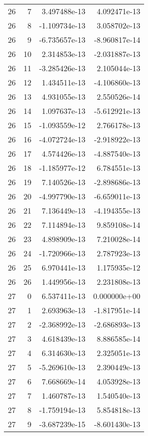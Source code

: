\begin{tabular}{rrrr}
  26 &    7 &  3.497488e-13 &  4.092471e-13 \\
  26 &    8 & -1.109734e-13 &  3.058702e-13 \\
  26 &    9 & -6.735657e-13 & -8.960817e-14 \\
  26 &   10 &  2.314853e-13 & -2.031887e-13 \\
  26 &   11 & -3.285426e-13 &  2.105044e-13 \\
  26 &   12 &  1.434511e-13 & -4.106860e-13 \\
  26 &   13 &  4.931055e-13 &  2.550526e-14 \\
  26 &   14 &  1.097637e-13 & -5.612921e-13 \\
  26 &   15 & -1.093559e-12 &  2.766178e-13 \\
  26 &   16 & -4.072724e-13 & -2.918922e-13 \\
  26 &   17 &  4.574426e-13 & -4.887540e-13 \\
  26 &   18 & -1.185977e-12 &  6.784551e-13 \\
  26 &   19 &  7.140526e-13 & -2.898686e-13 \\
  26 &   20 & -4.997790e-13 & -6.659011e-13 \\
  26 &   21 &  7.136449e-13 & -4.194355e-13 \\
  26 &   22 &  7.114894e-13 &  9.859108e-14 \\
  26 &   23 &  4.898909e-13 &  7.210028e-14 \\
  26 &   24 & -1.720966e-13 &  2.787923e-13 \\
  26 &   25 &  6.970441e-13 &  1.175935e-12 \\
  26 &   26 &  1.449956e-13 &  2.231808e-13 \\
  27 &    0 &  6.537411e-13 &  0.000000e+00 \\
  27 &    1 &  2.693963e-13 & -1.817951e-14 \\
  27 &    2 & -2.368992e-13 & -2.686893e-13 \\
  27 &    3 &  4.618439e-13 &  8.886585e-14 \\
  27 &    4 &  6.314630e-13 &  2.325051e-13 \\
  27 &    5 & -5.269610e-13 &  2.390449e-13 \\
  27 &    6 &  7.668669e-14 &  4.053928e-13 \\
  27 &    7 &  1.460787e-13 &  1.540540e-13 \\
  27 &    8 & -1.759194e-13 &  5.854818e-13 \\
  27 &    9 & -3.687239e-15 & -8.601430e-13 \\

\end{tabular}
